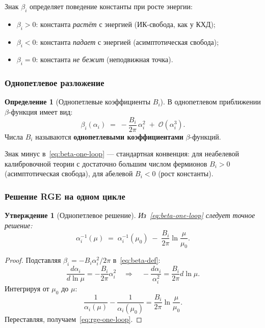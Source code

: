 \documentclass[11pt,a4paper]{article}
\newtheorem{proposition}[theorem]{Утверждение}
\theoremstyle{definition}
\newtheorem{definition}[theorem]{Определение}
\begin{document}
\medskip\noindent
Знак $\beta_i$ определяет поведение константы при росте энергии:
\begin{itemize}
    \item $\beta_i > 0$: константа \emph{растёт} с энергией
          (ИК-свобода, как у КХД);
    \item $\beta_i < 0$: константа \emph{падает} с энергией
          (асимптотическая свобода);
    \item $\beta_i = 0$: константа \emph{не бежит} (неподвижная точка).
\end{itemize}

\subsubsection{Однопетлевое разложение}

\begin{definition}[Однопетлевые коэффициенты $B_i$]
\label{def:Bi}
В однопетлевом приближении $\beta$-функция имеет вид:
\begin{equation}
    \beta_i(\alpha_i) \;=\; -\frac{B_i}{2\pi}\,\alpha_i^2
    \;+\; \mathcal{O}(\alpha_i^3).
    \label{eq:beta-one-loop}
\end{equation}
Числа $B_i$ называются \textbf{однопетлевыми коэффициентами}
$\beta$-функций.
\end{definition}

\medskip\noindent
Знак минус в~\eqref{eq:beta-one-loop} --- стандартная конвенция:
для неабелевой калибровочной теории с достаточно большим числом
фермионов $B_i > 0$ (асимптотическая свобода), для абелевой
$B_i < 0$ (рост константы).

\subsubsection{Решение RGE на одном цикле}

\begin{proposition}[Однопетлевое решение]
\label{prop:rge-one-loop}
Из~\eqref{eq:beta-one-loop} следует точное решение:
\begin{equation}
    \boxed{
    \alpha_i^{-1}(\mu) \;=\; \alpha_i^{-1}(\mu_0)
    \;-\; \frac{B_i}{2\pi} \ln\frac{\mu}{\mu_0}.
    }
    \label{eq:rge-one-loop}
\end{equation}
\end{proposition}

\begin{proof}
Подставляя $\beta_i = -B_i \alpha_i^2 / 2\pi$ в~\eqref{eq:beta-def}:
\begin{equation}
    \frac{d\alpha_i}{d \ln\mu} = -\frac{B_i}{2\pi} \alpha_i^2
    \quad\Longrightarrow\quad
    -\frac{d\alpha_i}{\alpha_i^2} = \frac{B_i}{2\pi} d \ln\mu.
\end{equation}
Интегрируя от $\mu_0$ до $\mu$:
\begin{equation}
    \frac{1}{\alpha_i(\mu)} - \frac{1}{\alpha_i(\mu_0)}
    = \frac{B_i}{2\pi} \ln\frac{\mu}{\mu_0}.
\end{equation}
Переставляя, получаем~\eqref{eq:rge-one-loop}.
\end{proof}
\end{document}
